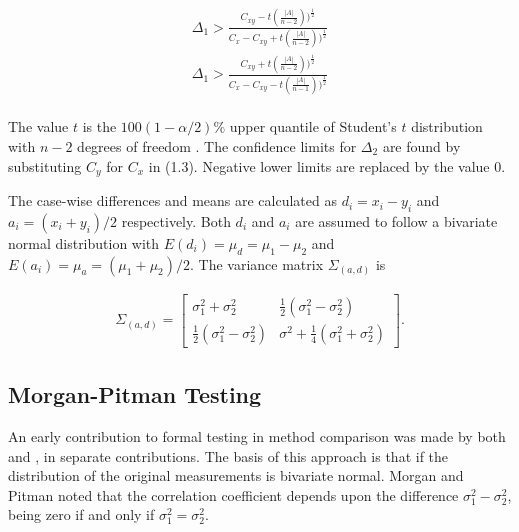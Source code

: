 \documentclass[12pt, a4paper]{article}
\begin{document}
	\begin{eqnarray}
		\Delta_{1} > \frac{C_{xy}-
			t(\frac{|A|}{n-2}))^{\frac{1}{2}}}{C_{x}-C_{xy}+
			t(\frac{|A|}{n-2}))^{\frac{1}{2}}} \\
		\Delta_{1} > \frac{C_{xy}+
			t(\frac{|A|}{n-2}))^{\frac{1}{2}}}{C_{x}-C_{xy}-
			t(\frac{|A|}{n-1}))^{\frac{1}{2}}} \nonumber
	\end{eqnarray}
	\\ The value $t$ is the $100(1-\alpha/2)\%$ upper quantile of
	Student's $t$ distribution with $n-2$ degrees of freedom
	\citep{Kinsella}. The confidence limits for $\Delta_{2}$ are found by substituting $C_{y}$ for $C_{x}$ in (1.3).
	Negative lower limits are replaced by the value $0$.
	
	
	
	
	The case-wise differences and means are calculated as $d_{i} =
	x_{i}-y_{i}$ and $a_{i} = (x_{i}+y_{i})/2$  respectively. Both
	$d_{i}$ and $a_{i}$ are assumed to follow a bivariate normal
	distribution with $E(d_{i})= \mu_{d} = \mu_{1} - \mu_{2}$ and
	$E(a_{i})= \mu_{a} = (\mu_{1} + \mu_{2})/2$. The variance matrix
	$\Sigma_{(a,d)}$ is
	
	\begin{eqnarray}
		\Sigma_{(a,d)}= \left[\begin{matrix}
			\sigma^{2}_{1}+\sigma^{2}_{2}&\frac{1}{2}(\sigma^{2}_{1}-\sigma^{2}_{2})\\
			\frac{1}{2}(\sigma^{2}_{1}-\sigma^{2}_{2})&\sigma^{2}+
			\frac{1}{4}(\sigma^{2}_{1}+\sigma^{2}_{2})
		\end{matrix} \right].
	\end{eqnarray}
	
	
	
	\subsection{Morgan-Pitman Testing}
	An early contribution to formal testing in method comparison was
	made by both \citet{morgan} and \citet{pitman}, in separate
	contributions. The basis of this approach is that if the
	distribution of the original measurements is bivariate normal.
	Morgan and Pitman noted that the correlation coefficient depends
	upon the difference $\sigma^{2}_{1}- \sigma^{2}_{2}$, being zero
	if and only if $\sigma^{2}_{1}=\sigma^{2}_{2}$.
	
\end{document}
